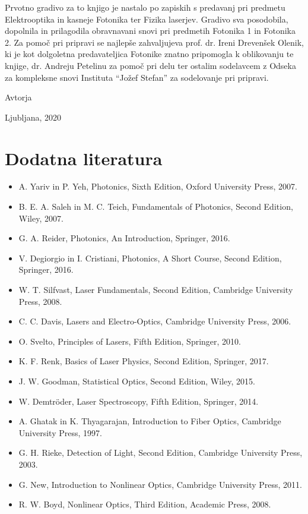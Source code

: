 \documentclass[11pt,fleqn]{book} %
\begin{document}
Prvotno gradivo za to knjigo je nastalo po zapiskih s predavanj pri predmetu 
Elektrooptika in kasneje Fotonika ter Fizika laserjev. Gradivo sva posodobila, dopolnila 
in prilagodila obravnavani snovi pri predmetih Fotonika 1 in Fotonika 2. 
Za pomoč pri pripravi se najlepše zahvaljujeva prof. dr. Ireni Drevenšek Olenik, ki je 
kot dolgoletna predavateljica Fotonike znatno pripomogla k oblikovanju te knjige,
dr. Andreju Petelinu za pomoč pri delu ter ostalim sodelavcem z Odseka za 
kompleksne snovi Instituta ``Jožef Stefan'' za sodelovanje pri pripravi.

\vspace{1em}

Avtorja

\hfill Ljubljana, 2020





\chapter*{Dodatna literatura}

\begin{itemize}
\setlength\itemsep{0.5em}
 \item A. Yariv in P. Yeh, Photonics, Sixth Edition, Oxford University Press, 2007.
 \item B. E. A. Saleh in M. C. Teich, Fundamentals of Photonics, Second Edition, Wiley, 2007. 
 \item G. A. Reider, Photonics, An Introduction, Springer, 2016.
 \item V. Degiorgio in I. Cristiani, Photonics, A Short Course, Second Edition, Springer, 2016.
 \item W. T. Silfvast, Laser Fundamentals, Second Edition, Cambridge University Press, 2008. 
 \item C. C. Davis, Lasers and Electro-Optics, Cambridge University Press, 2006.
 \item O. Svelto, Principles of Lasers, Fifth Edition, Springer, 2010.
 \item K. F. Renk, Basics of Laser Physics, Second Edition, Springer, 2017.
 \item J. W. Goodman, Statistical Optics, Second Edition, Wiley, 2015.
 \item W. Demtr\"oder, Laser Spectroscopy, Fifth Edition, Springer, 2014.
 \item A. Ghatak in K. Thyagarajan, Introduction to Fiber Optics, Cambridge University Press, 1997.
 \item G. H. Rieke, Detection of Light, Second Edition, Cambridge University Press, 2003.
 \item G. New, Introduction to Nonlinear Optics, Cambridge University Press, 2011.
 \item R. W. Boyd, Nonlinear Optics, Third Edition, Academic Press, 2008.
\end{itemize}
\end{document}

